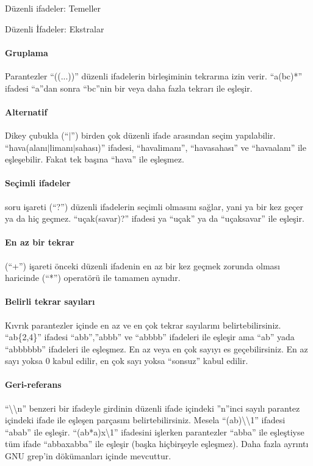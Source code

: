 \begin{section}{Düzenli ifadeler: Temeller}
\begin{subsection}{Düzenli İfadeler: Ekstralar}
\paragraph{Gruplama}{Parantezler “((...))” düzenli ifadelerin birleşiminin tekrarına izin verir. “a(bc)*” ifadesi “a”dan sonra “bc”nin bir veya daha fazla tekrarı ile eşleşir.}
\paragraph{Alternatif}{Dikey çubukla (“$\vert$”) birden çok düzenli ifade arasından seçim yapılabilir. “hava(alanı$\vert$limanı$\vert$sahası)” ifadesi, “havalimanı”, “havasahası” ve “havaalanı” ile eşleşebilir. Fakat tek başına “hava” ile eşleşmez.}
\paragraph{Seçimli ifadeler}{soru işareti (“?”) düzenli ifadelerin seçimli olmasını sağlar, yani ya bir kez geçer ya da hiç geçmez. “uçak(savar)?” ifadesi ya “uçak” ya da “uçaksavar” ile eşleşir.}
\paragraph{En az bir tekrar}{(“+”) işareti önceki düzenli ifadenin en az bir kez geçmek zorunda olması haricinde (“*”) operatörü ile tamamen aynıdır.}
\paragraph{Belirli tekrar sayıları}{Kıvrık parantezler içinde en az ve en çok tekrar sayılarını belirtebilirsiniz. “ab\{2,4\}” ifadesi “abb”,”abbb” ve “abbbb” ifadeleri ile eşleşir ama “ab” yada “abbbbbb” ifadeleri ile eşleşmez. En az veya en çok sayıyı es geçebilirsiniz. En az sayı yoksa 0 kabul edilir, en çok sayı yoksa “sonsuz” kabul edilir.}
\paragraph{Geri-referans}{“\textbackslash \textbackslash n” benzeri bir ifadeyle girdinin düzenli ifade içindeki ”n”inci sayılı parantez içindeki ifade ile eşleşen parçasını belirtebilirsiniz. Mesela “(ab)\textbackslash \textbackslash 1” ifadesi “abab” ile eşleşir. “(ab*a)x\textbackslash 1” ifadesini işlerken parantezler “abba” ile eşleştiyse tüm ifade “abbaxabba” ile eşleşir (başka hiçbirşeyle eşleşmez). Daha fazla ayrıntı GNU grep’in dökümanları içinde mevcuttur.}

\end{subsection}
\end{section}

